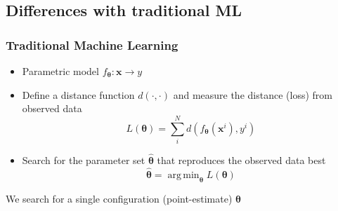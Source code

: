 \documentclass{beamer}
\newcommand{\thetab}{\boldsymbol{\theta}}
\newcommand{\xb}{\boldsymbol{x}}
\DeclareMathOperator*{\argmin}{arg\,min}
\begin{document}
\subsection{Differences with traditional ML}
\begin{frame}
  \frametitle{Traditional Machine Learning}
  \begin{itemize}
    \item Parametric model \( f_{\thetab}: \xb \rightarrow y \)
    \item Define a distance function \( d(\cdot, \cdot) \) and measure the
          distance (loss) from observed data
      \begin{equation}
        L(\thetab) = \sum_i^N d(f_{\thetab}(\xb^i), y^i)
      \end{equation}
    \item Search for the parameter set $\hat{\thetab}$ that reproduces the observed data best
      \begin{equation}
         \hat{\thetab} = \argmin_{\thetab} L(\thetab)
      \end{equation}
    \end{itemize}
    \noindent\makebox[\linewidth]{\rule{\paperwidth}{0.4pt}}
    We search for a \alert{single configuration (point-estimate) \( \hat{\thetab}\) }

\end{frame}
\end{document}
